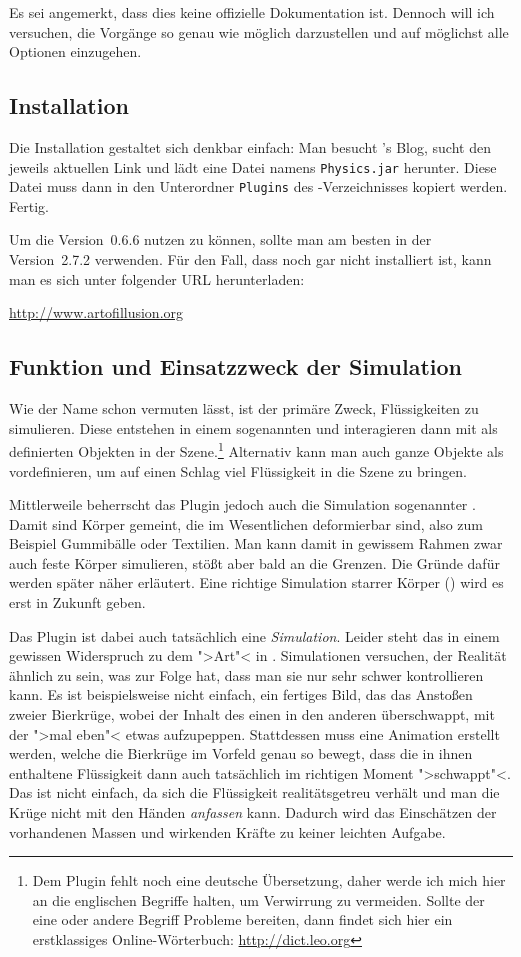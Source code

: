 \documentclass[10pt,DIV=14,a4paper]{scrartcl}
\begin{document}
Es sei angemerkt, dass dies keine offizielle Dokumentation ist. Dennoch
will ich versuchen, die Vorgänge so genau wie möglich darzustellen und
auf möglichst alle Optionen einzugehen.

\subsection{Installation}
Die Installation gestaltet sich denkbar einfach: Man besucht \deltor's
Blog, sucht den jeweils aktuellen Link und lädt eine Datei namens
\texttt{Physics.jar} herunter. Diese Datei muss dann in den Unterordner
\texttt{Plugins} des \aoi-Verzeichnisses kopiert werden. Fertig.

Um die Version~0.6.6 nutzen zu können, sollte man am besten \aoi
in der Version~2.7.2 verwenden. Für den Fall, dass \aoi noch gar nicht
installiert ist, kann man es sich unter folgender URL herunterladen:

\url{http://www.artofillusion.org}

\subsection{Funktion und Einsatzzweck der Simulation}
Wie der Name schon vermuten lässt, ist der primäre Zweck, Flüssigkeiten
zu simulieren. Diese entstehen in einem sogenannten  und
interagieren dann mit als  definierten Objekten in der
Szene.\footnote{Dem Plugin fehlt noch eine deutsche Übersetzung, daher
werde ich mich hier an die englischen Begriffe halten, um Verwirrung zu
vermeiden. Sollte der eine oder andere Begriff Probleme bereiten, dann
findet sich hier ein erstklassiges Online-Wörterbuch:
\url{http://dict.leo.org}} Alternativ kann man auch ganze Objekte als
 vordefinieren, um auf einen Schlag viel Flüssigkeit in die
Szene zu bringen.

Mittlerweile beherrscht das Plugin jedoch auch die Simulation
sogenannter . Damit sind Körper gemeint, die im
Wesentlichen deformierbar sind, also zum Beispiel Gummibälle oder
Textilien. Man kann damit in gewissem Rahmen zwar auch feste Körper
simulieren, stößt aber bald an die Grenzen. Die Gründe dafür werden
später näher erläutert. Eine richtige Simulation starrer Körper
() wird es erst in Zukunft geben.

Das Plugin ist dabei auch tatsächlich eine \emph{Simulation}. Leider
steht das in einem gewissen Widerspruch zu dem ">Art"< in \aoi.
Simulationen versuchen, der Realität ähnlich zu sein, was zur Folge hat,
dass man sie nur sehr schwer kontrollieren kann. Es ist beispielsweise
nicht einfach, ein fertiges Bild, das das Anstoßen zweier Bierkrüge,
wobei der Inhalt des einen in den anderen überschwappt, mit der
\fluidsim ">mal eben"< etwas aufzupeppen. Stattdessen muss eine
Animation erstellt werden, welche die Bierkrüge im Vorfeld genau so
bewegt, dass die in ihnen enthaltene Flüssigkeit dann auch tatsächlich
im richtigen Moment ">schwappt"<.  Das ist nicht einfach, da sich die
Flüssigkeit realitätsgetreu verhält und man die Krüge nicht mit den
Händen \emph{anfassen} kann. Dadurch wird das Einschätzen der
vorhandenen Massen und wirkenden Kräfte zu keiner leichten Aufgabe.
\end{document}
